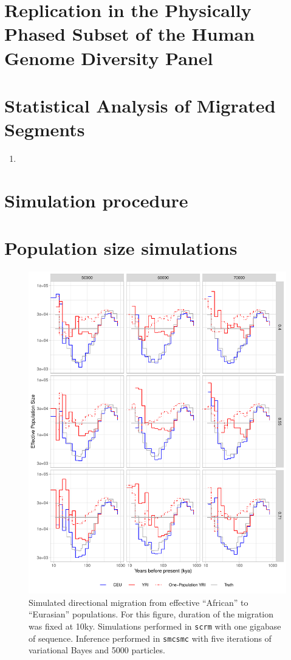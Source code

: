 \documentclass{article}
\begin{document}
\section{Replication in the Physically Phased Subset of the Human Genome Diversity Panel} \label{hgdp_section}

\section{Statistical Analysis of Migrated Segments} \label{dstats_section}


\begin{enumerate}
	\item 
\end{enumerate}

\section{Simulation procedure} \label{simproc}
\section{Population size simulations} \label{nesim}

\begin{figure}
	\centering
	\includegraphics[width=\textwidth]{../plot/old_all_li_durbin.pdf}
	\caption{Simulated directional migration from effective ``African'' to ``Eurasian'' populations. For this figure, duration of the migration was fixed at 10ky. Simulations performed in {\tt scrm} with one gigabase of sequence. Inference performed in {\tt smcsmc} with five iterations of variational Bayes and 5000 particles.}
	\label{nesims_10ky}
\end{figure}
\end{document}
